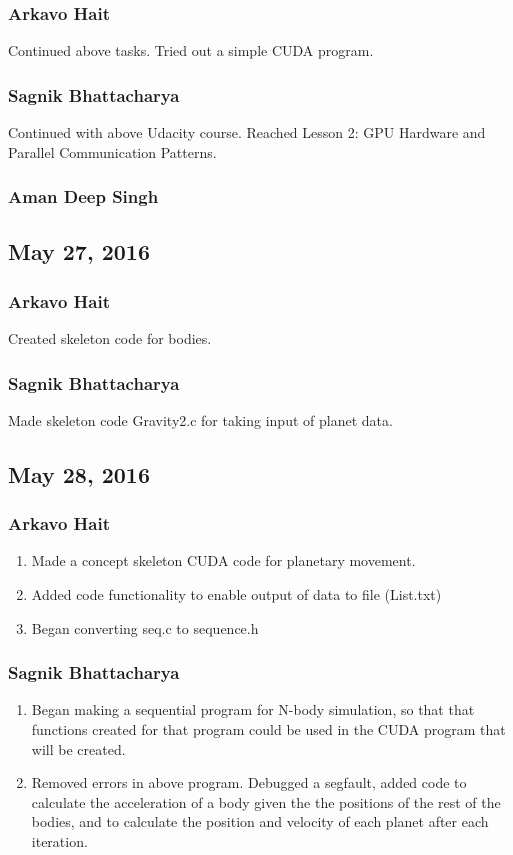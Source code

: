 \documentclass{article}
\begin{document}
\subsubsection*{Arkavo Hait}
Continued above tasks. Tried out a simple CUDA program.
\subsubsection*{Sagnik Bhattacharya}
Continued with above Udacity course. Reached Lesson 2: GPU Hardware and Parallel Communication Patterns.
\subsubsection*{Aman Deep Singh}
\subsection*{May 27, 2016}
\subsubsection*{Arkavo Hait}
Created skeleton code for bodies.
\subsubsection*{Sagnik Bhattacharya}
Made skeleton code Gravity2.c for taking input of planet data.
\subsection*{May 28, 2016}
\subsubsection*{Arkavo Hait}
\begin{enumerate}
	\item Made a concept skeleton CUDA code for planetary movement.
	\item Added code functionality to enable output of data to file (List.txt)
	\item Began converting seq.c to sequence.h
\end{enumerate}
\subsubsection*{Sagnik Bhattacharya}
\begin{enumerate}
	\item Began making a sequential program for N-body simulation, so that that functions created for that program could be used in the CUDA program that will be created.
	\item Removed errors in above program. Debugged a segfault, added code to calculate the acceleration of a body given the the positions of the rest of the bodies, and to calculate the position and velocity of each planet after each iteration.
\end{enumerate}
\end{document}

